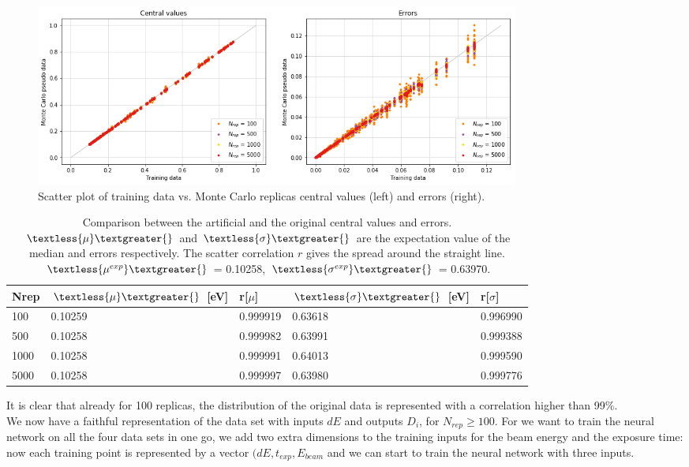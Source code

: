 \documentclass[11pt,a4paper]{article}
\numberwithin{equation}{section}
\numberwithin{figure}{section}
\numberwithin{table}{section}
\begin{document}
\begin{figure}[H]
    \centering 
    \includegraphics[width=160mm]{plots/Montecarlovacuum.png}
    \caption{Scatter plot of training data vs. Monte Carlo replicas central values (left) and errors (right). }
    \label{mcvacuum}
\end{figure}
\begin{table}[H]
\centering
\begin{tabular}{|l|ll|ll|}
\hline
Nrep & $\textless{\mu}\textgreater{}$ {[}eV{]} & r{[}$\mu${]} & $\textless{\sigma}\textgreater{}$ {[}eV{]} & r{[}$\sigma${]} \\ \hline
100  & 0.10259                           & 0.999919   & 0.63618                                  & 0.996990      \\ \hline
500  & 0.10258                              & 0.999982   & 0.63991                                  & 0.999388      \\ \hline
1000 & 0.10258                              & 0.999991   & 0.64013                                  & 0.999590      \\ \hline
5000 & 0.10258                              & 0.999997   & 0.63980                                  & 0.999776      \\ \hline
\end{tabular}
\caption{Comparison between the artificial and the original central values and errors. $\textless{\mu}\textgreater{}$ and $\textless{\sigma}\textgreater{}$ are the expectation value of the median and errors respectively. The scatter correlation $r$ gives the spread around the straight line. $\textless{\mu^{exp}}\textgreater{}$ = 0.10258, $\textless{\sigma^{exp}}\textgreater{}$ = 0.63970. }
\label{tablemcvacuum}
\end{table}
It is clear that already for 100 replicas, the distribution of the original data is represented with a correlation higher than 99\%. \\

We now have a faithful representation of the data set with inputs  $dE$ and outputs $D_i$, for $N_{rep} \geq 100$. For we want to train the neural network on all the four data sets in one go, we add two extra dimensions to the training inputs for the beam energy and the exposure time: now each training point is represented by a vector $(dE, t_{exp}, E_{beam}$ and we can start to train the neural network with three inputs.
\end{document}
